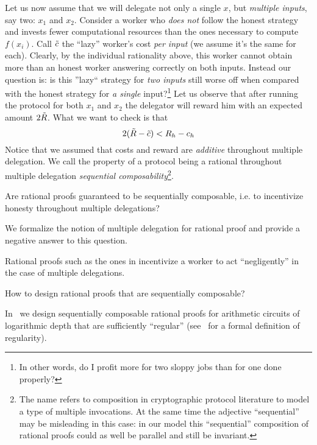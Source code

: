 Let us now assume that we will delegate not only a single $x$, but \textit{multiple inputs}, say two: $x_1$ and $x_2$. Consider a worker who \textit{does not} follow the honest strategy and invests fewer computational resources than the ones necessary to compute $f(x_i)$. Call $\tilde{c}$ the ``lazy'' worker's cost \textit{per input} (we assume it's the same for each). Clearly, by the individual rationality above, this worker cannot obtain more than an honest worker answering correctly on both inputs. Instead our question is: is this ''lazy`` strategy for \textit{two inputs} still worse off when compared with the honest strategy for \textit{a single} input?\footnote{In other words, do I profit more for two sloppy jobs than for one done properly?}
Let us observe that after running the protocol for both $x_1$ and $x_2$ the delegator will reward him with an expected amount $2\tilde{R}$. What we want to check is that
\[
	2(\tilde{R} - \tilde{c}) <  R_h - c_h
\]
Notice that we assumed that costs and reward are \textit{additive} throughout multiple delegation. We call the property of a protocol being a rational throughout multiple delegation \textit{sequential composability}\footnote{The name refers to composition in cryptographic protocol literature to model a type of multiple invocations. At the same time the adjective ``sequential'' may be misleading in this case: in our model this ``sequential'' composition of rational proofs could as well be parallel and still be invariant.}.

\begin{question}
	Are rational proofs guaranteed to be sequentially composable, i.e. to incentivize honesty throughout multiple delegations?
\end{question}

We formalize the notion of multiple delegation for rational proof and provide a negative answer to this question.

\begin{result}[~\cite{cg15}]
	Rational proofs such as the ones in \cite{am1} incentivize a worker
	to act ``negligently'' in the case of multiple delegations.
\end{result}

\begin{question}
	How to design rational proofs that are sequentially composable?
\end{question}

In~\cite{cg15} we design sequentially composable rational proofs for arithmetic circuits of logarithmic depth that are sufficiently ``regular'' (see~\cite{cg15} for a formal definition of regularity).

